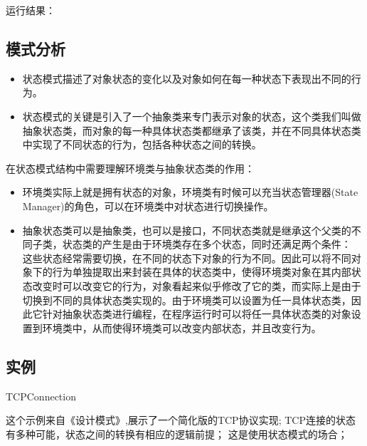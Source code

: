 \documentclass[letterpaper,10pt,english]{sphinxmanual}
\begin{document}
\sphinxAtStartPar
运行结果：

\noindent{}


\subsection{模式分析}
\label{\detokenize{behavioral_patterns/state:id8}}\begin{itemize}
\item {} 
\sphinxAtStartPar
状态模式描述了对象状态的变化以及对象如何在每一种状态下表现出不同的行为。

\item {} 
\sphinxAtStartPar
状态模式的关键是引入了一个抽象类来专门表示对象的状态，这个类我们叫做抽象状态类，而对象的每一种具体状态类都继承了该类，并在不同具体状态类中实现了不同状态的行为，包括各种状态之间的转换。

\end{itemize}

\sphinxAtStartPar
在状态模式结构中需要理解环境类与抽象状态类的作用：
\begin{itemize}
\item {} 
\sphinxAtStartPar
环境类实际上就是拥有状态的对象，环境类有时候可以充当状态管理器(State Manager)的角色，可以在环境类中对状态进行切换操作。

\item {} 
\sphinxAtStartPar
抽象状态类可以是抽象类，也可以是接口，不同状态类就是继承这个父类的不同子类，状态类的产生是由于环境类存在多个状态，同时还满足两个条件： 这些状态经常需要切换，在不同的状态下对象的行为不同。因此可以将不同对象下的行为单独提取出来封装在具体的状态类中，使得环境类对象在其内部状态改变时可以改变它的行为，对象看起来似乎修改了它的类，而实际上是由于切换到不同的具体状态类实现的。由于环境类可以设置为任一具体状态类，因此它针对抽象状态类进行编程，在程序运行时可以将任一具体状态类的对象设置到环境类中，从而使得环境类可以改变内部状态，并且改变行为。

\end{itemize}


\subsection{实例}
\label{\detokenize{behavioral_patterns/state:id9}}
\sphinxAtStartPar
TCPConnection

\sphinxAtStartPar
这个示例来自《设计模式》,展示了一个简化版的TCP协议实现;
TCP连接的状态有多种可能，状态之间的转换有相应的逻辑前提；
这是使用状态模式的场合；
\end{document}
